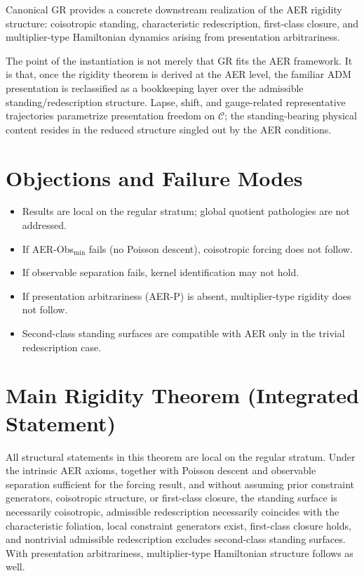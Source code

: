 \documentclass[11pt]{article}
\theoremstyle{remark}
\theoremstyle{plain}
\begin{document}
Canonical GR provides a concrete downstream realization of the AER rigidity structure:
coisotropic standing, characteristic redescription, first-class closure, and multiplier-type Hamiltonian dynamics arising from presentation arbitrariness.

The point of the instantiation is not merely that GR fits the AER framework.
It is that, once the rigidity theorem is derived at the AER level, the familiar ADM presentation is reclassified as a bookkeeping layer over the admissible standing/redescription structure. Lapse, shift, and gauge-related representative trajectories parametrize presentation freedom on $\mathcal{C}$; the standing-bearing physical content resides in the reduced structure singled out by the AER conditions.



\section*{Objections and Failure Modes}

\begin{itemize}
\item Results are local on the regular stratum; global quotient pathologies are not addressed.
\item If AER-Obs$_{\min}$ fails (no Poisson descent), coisotropic forcing does not follow.
\item If observable separation fails, kernel identification may not hold.
\item If presentation arbitrariness (AER-P) is absent, multiplier-type rigidity does not follow.
\item Second-class standing surfaces are compatible with AER only in the trivial redescription case.
\end{itemize}

\section*{Main Rigidity Theorem (Integrated Statement)}

All structural statements in this theorem are local on the regular stratum.
Under the intrinsic AER axioms, together with Poisson descent and observable separation sufficient for the forcing result,
and without assuming prior constraint generators, coisotropic structure, or first-class closure,
the standing surface is necessarily coisotropic,
admissible redescription necessarily coincides with the characteristic foliation,
local constraint generators exist,
first-class closure holds,
and nontrivial admissible redescription excludes second-class standing surfaces.
With presentation arbitrariness, multiplier-type Hamiltonian structure follows as well.
\end{document}
